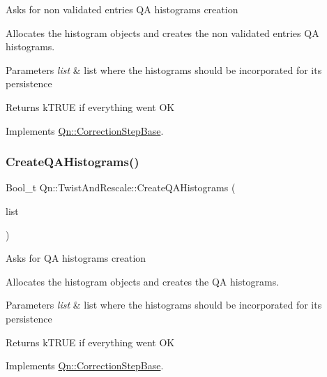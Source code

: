 Asks for non validated entries QA histograms creation

Allocates the histogram objects and creates the non validated entries QA histograms. 
\begin{DoxyParams}{Parameters}
{\em list} & list where the histograms should be incorporated for its persistence \\
\hline
\end{DoxyParams}
\begin{DoxyReturn}{Returns}
k\+T\+R\+UE if everything went OK 
\end{DoxyReturn}


Implements \mbox{\hyperlink{classQn_1_1CorrectionStepBase_acb488e715005f027e39c21ae5f4684da}{Qn\+::\+Correction\+Step\+Base}}.

\mbox{\label{classQn_1_1TwistAndRescale_a048fe37fdbd61696d5b0ed7eadbde1d1}} 
\subsubsection{\texorpdfstring{Create\+Q\+A\+Histograms()}{CreateQAHistograms()}}
{\footnotesize\ttfamily Bool\+\_\+t Qn\+::\+Twist\+And\+Rescale\+::\+Create\+Q\+A\+Histograms (\begin{DoxyParamCaption}\item[{T\+List $\ast$}]{list }\end{DoxyParamCaption})\hspace{0.3cm}{\ttfamily [virtual]}}

Asks for QA histograms creation

Allocates the histogram objects and creates the QA histograms. 
\begin{DoxyParams}{Parameters}
{\em list} & list where the histograms should be incorporated for its persistence \\
\hline
\end{DoxyParams}
\begin{DoxyReturn}{Returns}
k\+T\+R\+UE if everything went OK 
\end{DoxyReturn}


Implements \mbox{\hyperlink{classQn_1_1CorrectionStepBase_a21f58f5d91209c1c74d0928cf0b3e26d}{Qn\+::\+Correction\+Step\+Base}}.

